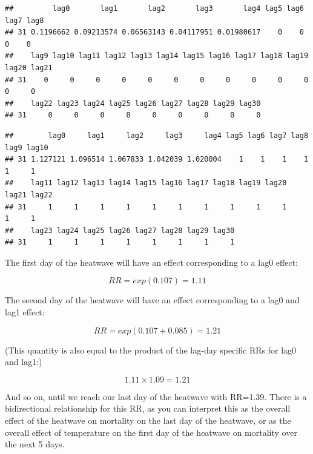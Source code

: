 \documentclass[
]{book}
\newenvironment{Shaded}{\begin{snugshade}}{\end{snugshade}}
\newcommand{\DocumentationTok}[1]{\textcolor[rgb]{0.56,0.35,0.01}{\textbf{\textit{#1}}}}
\newcommand{\NormalTok}[1]{#1}
\newcommand{\SpecialCharTok}[1]{\textcolor[rgb]{0.81,0.36,0.00}{\textbf{#1}}}
\begin{document}
\begin{Shaded}
\end{Shaded}

\begin{verbatim}
##         lag0       lag1       lag2       lag3       lag4 lag5 lag6 lag7 lag8
## 31 0.1196662 0.09213574 0.06563143 0.04117951 0.01980617    0    0    0    0
##    lag9 lag10 lag11 lag12 lag13 lag14 lag15 lag16 lag17 lag18 lag19 lag20 lag21
## 31    0     0     0     0     0     0     0     0     0     0     0     0     0
##    lag22 lag23 lag24 lag25 lag26 lag27 lag28 lag29 lag30
## 31     0     0     0     0     0     0     0     0     0
\end{verbatim}

\begin{Shaded}
\end{Shaded}

\begin{verbatim}
##        lag0     lag1     lag2     lag3     lag4 lag5 lag6 lag7 lag8 lag9 lag10
## 31 1.127121 1.096514 1.067833 1.042039 1.020004    1    1    1    1    1     1
##    lag11 lag12 lag13 lag14 lag15 lag16 lag17 lag18 lag19 lag20 lag21 lag22
## 31     1     1     1     1     1     1     1     1     1     1     1     1
##    lag23 lag24 lag25 lag26 lag27 lag28 lag29 lag30
## 31     1     1     1     1     1     1     1     1
\end{verbatim}

The first day of the heatwave will have an effect corresponding to a lag0 effect:

\[
RR=exp(0.107)=1.11
\]

The second day of the heatwave will have an effect corresponding to a lag0 and lag1 effect:

\[
RR = exp(0.107 + 0.085) = 1.21
\]

(This quantity is also equal to the product of the lag-day specific RRs for lag0 and lag1:)

\[
1.11 \times 1.09 = 1.21
\]

And so on, until we reach our last day of the heatwave with RR=1.39. There is a bidirectional relationship for this RR, as you can interpret this as the overall effect of the heatwave on mortality on the last day of the heatwave, or as the overall effect of temperature on the first day of the heatwave on mortality over the next 5 days.
\end{document}
